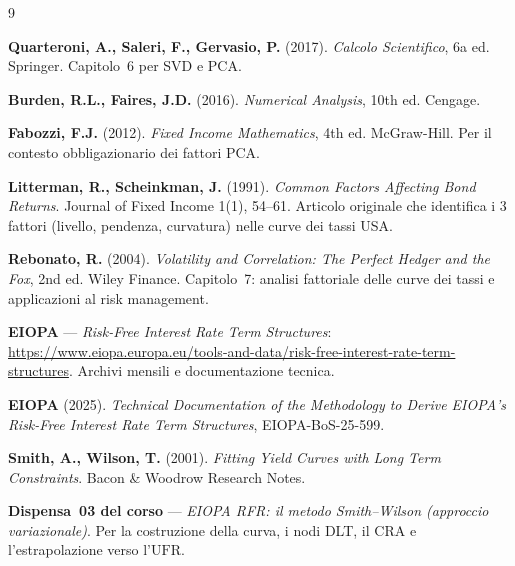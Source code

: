 \documentclass[11pt,a4paper]{article}
\newcommand{\UFR}{\ensuremath{\mathrm{UFR}}}
\newcommand{\CRA}{\ensuremath{\mathrm{CRA}}}
\theoremstyle{plain}
\theoremstyle{definition}
\theoremstyle{remark}
\begin{document}
\renewcommand{\refname}{Riferimenti bibliografici}
\begin{thebibliography}{9}

  \textbf{Quarteroni, A., Saleri, F., Gervasio, P.} (2017).
  \textit{Calcolo Scientifico}, 6a ed. Springer.
  Capitolo~6 per SVD e PCA.

  \textbf{Burden, R.L., Faires, J.D.} (2016).
  \textit{Numerical Analysis}, 10th ed. Cengage.

  \textbf{Fabozzi, F.J.} (2012).
  \textit{Fixed Income Mathematics}, 4th ed. McGraw-Hill.
  Per il contesto obbligazionario dei fattori PCA.

  \textbf{Litterman, R., Scheinkman, J.} (1991).
  \textit{Common Factors Affecting Bond Returns}.
  Journal of Fixed Income 1(1), 54--61.
  Articolo originale che identifica i 3 fattori (livello, pendenza, curvatura)
  nelle curve dei tassi USA.

  \textbf{Rebonato, R.} (2004).
  \textit{Volatility and Correlation: The Perfect Hedger and the Fox},
  2nd ed. Wiley Finance.
  Capitolo~7: analisi fattoriale delle curve dei tassi e applicazioni al
  risk management.

  \textbf{EIOPA} --- \emph{Risk-Free Interest Rate Term Structures}:
  \url{https://www.eiopa.europa.eu/tools-and-data/risk-free-interest-rate-term-structures}.
  Archivi mensili e documentazione tecnica.

  \textbf{EIOPA} (2025). \textit{Technical Documentation of the Methodology to
  Derive EIOPA's Risk-Free Interest Rate Term Structures},
  EIOPA-BoS-25-599.

  \textbf{Smith, A., Wilson, T.} (2001).
  \textit{Fitting Yield Curves with Long Term Constraints}.
  Bacon \& Woodrow Research Notes.

  \textbf{Dispensa~03 del corso} --- \textit{EIOPA RFR: il metodo
  Smith--Wilson (approccio variazionale)}. Per la costruzione della curva,
  i nodi DLT, il $\CRA$ e l'estrapolazione verso l'$\UFR$.

\end{thebibliography}
\end{document}
